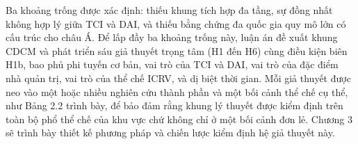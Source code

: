 \documentclass[
  a4paper,
  13pt]{extreport}
\begin{document}
Ba khoảng trống được xác định: thiếu khung tích hợp đa tầng, sự đồng
nhất không hợp lý giữa TCI và DAI, và thiếu bằng chứng đa quốc gia quy
mô lớn có cấu trúc cho châu Á. Để lấp đầy ba khoảng trống này, luận án
đề xuất khung CDCM và phát triển sáu giả thuyết trọng tâm (H1 đến H6)
cùng điều kiện biên H1b, bao phủ phi tuyến cơ bản, vai trò của TCI và
DAI, vai trò của đặc điểm nhà quản trị, vai trò của thể chế ICRV, và dị
biệt thời gian. Mỗi giả thuyết được neo vào một hoặc nhiều nghiên cứu
thành phần và một bối cảnh thể chế cụ thể, như Bảng 2.2 trình bày, để
bảo đảm rằng khung lý thuyết được kiểm định trên toàn bộ phổ thể chế của
khu vực chứ không chỉ ở một bối cảnh đơn lẻ. Chương 3 sẽ trình bày thiết
kế phương pháp và chiến lược kiểm định hệ giả thuyết này.
\end{document}
